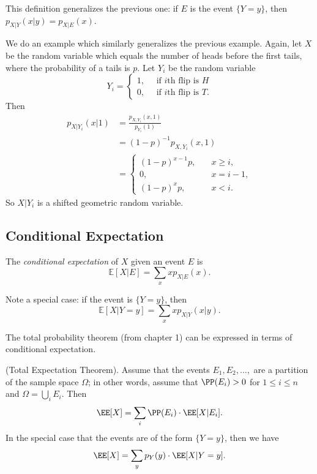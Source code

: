 \documentclass{ximera}
\begin{document}
This definition generalizes the previous one: if $E$ is the event $\{Y=y\}$, then $p_{X\vert Y}(x \vert y) = p_{X \vert E}(x)$.


We do an example which similarly generalizes the previous example. Again, let $X$ be the random variable which equals the number of heads before the first tails, where the probability of a tails is $p$. Let $Y_i$ be the random variable
$$
Y_i = 
\begin{cases}
1, \quad \text{ if } i\text{th flip is } H\\
0, \quad \text{ if } i\text{th flip is } T.
\end{cases}
$$
Then 
\begin{align*}
p_{X \vert Y_i}(x \vert 1) &= \frac{p_{X,Y_i}(x,1)}{p_{Y_i}(1)} \\
&= (1-p)^{-1} p_{X,Y_i}(x,1) \\
&= 
\begin{cases}
(1-p)^{x-1} p, & \quad x \geq i,\\
0, & \quad x = i-1,\\
(1-p)^x p , & \quad x < i.
\end{cases}
\end{align*}
So $X \vert Y_i$ is a shifted geometric random variable.

\subsection{Conditional Expectation}

\begin{definition}
The \textit{conditional expectation} of $X$ given an event $E$ is
$$
\mathbb{E}[X \vert E] = \sum_x x p_{X\vert E}(x).
$$
\end{definition}

Note a special case: if the event is $\{Y=y\}$, then 
$$
\mathbb{E}[X \vert Y=y ] = \sum_x x p_{X \vert Y}(x \vert y).
$$

The total probability theorem (from chapter 1) can be expressed in terms of conditional expectation.
\begin{theorem}
(Total Expectation Theorem). Assume that the events $E_1,E_2,\ldots,$ are a partition of the sample space $\Omega$; in other words, assume that $\PP(E_i)>0$ for $1\leq i \leq n$ and $\Omega = \bigcup_{i} E_i$. Then
$$
\EE[X] = \sum_i \PP(E_i) \cdot \EE[X \vert E_i].
$$
In the special case that the events are of the form $\{Y = y\}$, then we have
$$
\EE[X] = \sum_y p_Y(y) \cdot \EE[X \vert Y=y].
$$

\end{theorem}
\end{document}
